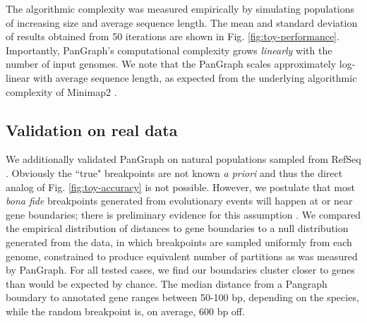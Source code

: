 \documentclass[aps,rmp,reprint,superscriptaddress,notitlepage,10pt]{revtex4-1}
\begin{document}
The algorithmic complexity was measured empirically by simulating populations of increasing size and average sequence length.
The mean and standard deviation of results obtained from 50 iterations are shown in Fig. \ref{fig:toy-performance}.
Importantly, PanGraph's computational complexity grows \emph{linearly} with the number of input genomes.
We note that the PanGraph scales approximately log-linear with average sequence length, as expected from the underlying algorithmic complexity of Minimap2 \cite{li2018minimap2}.

\subsection{Validation on real data}

We additionally validated PanGraph on natural populations sampled from RefSeq \cite{o2016reference}.
Obviously the ``true" breakpoints are not known \emph{a priori} and thus the direct analog of Fig. \ref{fig:toy-accuracy} is not possible.
However, we postulate that most \emph{bona fide} breakpoints generated from evolutionary events will happen at or near gene boundaries; there is preliminary evidence for this assumption \cite{oliveira2017chromosomal}.
We compared the empirical distribution of distances to gene boundaries to a null distribution generated from the data, in which breakpoints are sampled uniformly from each genome, constrained to produce equivalent number of partitions as was measured by PanGraph.
For all tested cases, we find our boundaries cluster closer to genes than would be expected by chance.
The median distance from a Pangraph boundary to annotated gene ranges between 50-100 bp, depending on the species, while the random breakpoint is, on average, 600 bp off.
\end{document}
